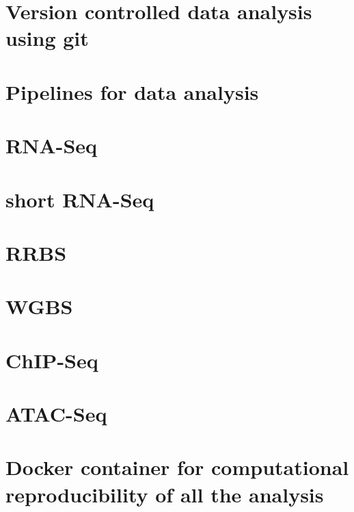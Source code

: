 \documentclass[12pt,twoside]{reedthesis}
\begin{document}
\hypertarget{version-controlled-data-analysis-using-git}{%
\section{Version controlled data analysis using git}\label{version-controlled-data-analysis-using-git}}

\hypertarget{pipelines-for-data-analysis}{%
\section{Pipelines for data analysis}\label{pipelines-for-data-analysis}}

\hypertarget{rna-seq}{%
\section{RNA-Seq}\label{rna-seq}}

\hypertarget{short-rna-seq}{%
\section{short RNA-Seq}\label{short-rna-seq}}

\hypertarget{rrbs}{%
\section{RRBS}\label{rrbs}}

\hypertarget{wgbs}{%
\section{WGBS}\label{wgbs}}

\hypertarget{chip-seq}{%
\section{ChIP-Seq}\label{chip-seq}}

\hypertarget{atac-seq}{%
\section{ATAC-Seq}\label{atac-seq}}

\hypertarget{docker-container-for-computational-reproducibility-of-all-the-analysis}{%
\section{Docker container for computational reproducibility of all the analysis}\label{docker-container-for-computational-reproducibility-of-all-the-analysis}}
\end{document}
